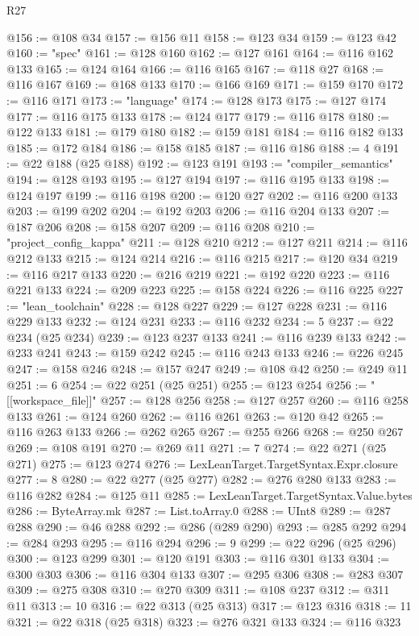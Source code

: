 \begin{lexlean}{R27}
\begin{coremodule}
@156 := @108 @34
@157 := @156 @11
@158 := @123 @34
@159 := @123 @42
@160 := "spec"
@161 := @128 @160
@162 := @127 @161
@164 := @116 @162 @133
@165 := @124 @164
@166 := @116 @165
@167 := @118 @27
@168 := @116 @167
@169 := @168 @133
@170 := @166 @169
@171 := @159 @170
@172 := @116 @171
@173 := "language"
@174 := @128 @173
@175 := @127 @174
@177 := @116 @175 @133
@178 := @124 @177
@179 := @116 @178
@180 := @122 @133
@181 := @179 @180
@182 := @159 @181
@184 := @116 @182 @133
@185 := @172 @184
@186 := @158 @185
@187 := @116 @186
@188 := 4
@191 := @22 @188 (@25 @188)
@192 := @123 @191
@193 := "compiler_semantics"
@194 := @128 @193
@195 := @127 @194
@197 := @116 @195 @133
@198 := @124 @197
@199 := @116 @198
@200 := @120 @27
@202 := @116 @200 @133
@203 := @199 @202
@204 := @192 @203
@206 := @116 @204 @133
@207 := @187 @206
@208 := @158 @207
@209 := @116 @208
@210 := "project_config_kappa"
@211 := @128 @210
@212 := @127 @211
@214 := @116 @212 @133
@215 := @124 @214
@216 := @116 @215
@217 := @120 @34
@219 := @116 @217 @133
@220 := @216 @219
@221 := @192 @220
@223 := @116 @221 @133
@224 := @209 @223
@225 := @158 @224
@226 := @116 @225
@227 := "lean_toolchain"
@228 := @128 @227
@229 := @127 @228
@231 := @116 @229 @133
@232 := @124 @231
@233 := @116 @232
@234 := 5
@237 := @22 @234 (@25 @234)
@239 := @123 @237 @133
@241 := @116 @239 @133
@242 := @233 @241
@243 := @159 @242
@245 := @116 @243 @133
@246 := @226 @245
@247 := @158 @246
@248 := @157 @247
@249 := @108 @42
@250 := @249 @11
@251 := 6
@254 := @22 @251 (@25 @251)
@255 := @123 @254
@256 := "[[workspace_file]]"
@257 := @128 @256
@258 := @127 @257
@260 := @116 @258 @133
@261 := @124 @260
@262 := @116 @261
@263 := @120 @42
@265 := @116 @263 @133
@266 := @262 @265
@267 := @255 @266
@268 := @250 @267
@269 := @108 @191
@270 := @269 @11
@271 := 7
@274 := @22 @271 (@25 @271)
@275 := @123 @274
@276 := LexLeanTarget.TargetSyntax.Expr.closure
@277 := 8
@280 := @22 @277 (@25 @277)
@282 := @276 @280 @133
@283 := @116 @282
@284 := @125 @11
@285 := LexLeanTarget.TargetSyntax.Value.bytes
@286 := ByteArray.mk
@287 := List.toArray.{0}
@288 := UInt8
@289 := @287 @288
@290 := @46 @288
@292 := @286 (@289 @290)
@293 := @285 @292
@294 := @284 @293
@295 := @116 @294
@296 := 9
@299 := @22 @296 (@25 @296)
@300 := @123 @299
@301 := @120 @191
@303 := @116 @301 @133
@304 := @300 @303
@306 := @116 @304 @133
@307 := @295 @306
@308 := @283 @307
@309 := @275 @308
@310 := @270 @309
@311 := @108 @237
@312 := @311 @11
@313 := 10
@316 := @22 @313 (@25 @313)
@317 := @123 @316
@318 := 11
@321 := @22 @318 (@25 @318)
@323 := @276 @321 @133
@324 := @116 @323

\end{coremodule}
\end{lexlean}
